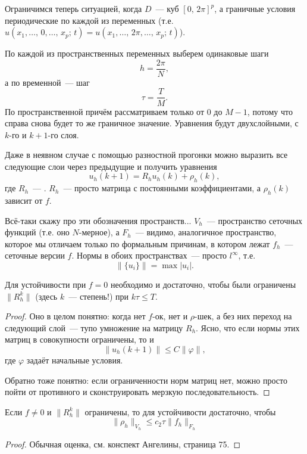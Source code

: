 \documentclass{trlnotes}
\begin{document}
	Ограничимся теперь ситуацией, когда $D$~--- куб $[0, \, 2\pi]^p$, а граничные условия периодические по каждой из переменных (т.е. $u(x_1, \ldots, \, 0, \ldots, \, x_p; \, t) = u(x_1, \ldots, \, 2\pi, \ldots, \, x_p; \, t)$). 

	По каждой из пространственных переменных выберем одинаковые шаги
	\[
		h = \dfrac{2\pi}{N},
	\] 
	а по временной~--- шаг
	\[
		\tau = \dfrac{T}{M}.
	\]
	По пространственной причём рассматриваем только от $0$ до $M-1$, потому что справа снова будет то же граничное значение. Уравнения будут двухслойными, с $k$-го и $k+1$-го слоя.

	Даже в неявном случае с помощью разностной прогонки можно выразить все следующие слои через предыдущие и получить уравнения
	\[
		u_h(k + 1) = R_h u_h(k) + \rho_h(k),
	\]
	где $R_h$~--- . $R_h$~--- просто матрица с постоянными коэффициентами, а $\rho_h(k)$ зависит от $f$.

	\begin{rem}
		Всё-таки скажу про эти обозначения пространств... $V_h$~--- пространство сеточных функций  (т.е. оно $N$-мерное), а $F_h$~--- видимо, аналогичное пространство, которое мы отличаем только по формальным причинам, в котором лежат $f_h$~--- сеточные версии $f$. Нормы в обоих пространствах~--- просто $l^{\infty}$, т.е.
		\[
			\big\|\{u_i\}\big\| = \max |u_i|.
		\]
	\end{rem}

	\begin{thm} \label{thm:stab-1}
		Для устойчивости при $f = 0$ необходимо и достаточно, чтобы были ограничены $\|R_h^k\|$ (здесь $k$~--- степень!) при $k\tau \leqslant T$.
		\begin{proof}
			Оно в целом понятно: когда нет $f$-ок, нет и $\rho$-шек, а без них переход на следующий слой~--- тупо умножение на матрицу $R_h$. Ясно, что если нормы этих матриц в совокупности ограничены, то и
			\[
				\|u_h(k+1)\| \leqslant C \|\varphi\|,
			\]
			где $\varphi$ задаёт начальные условия.

			Обратно тоже понятно: если ограниченности норм матриц нет, можно просто пойти от противного и сконструировать мерзкую последовательность.
		\end{proof}
	\end{thm}

	\begin{thm}
		Если $f \neq 0$ и $\|R_h^k\|$ ограничены, то для устойчивости достаточно, чтобы
		\[
			\|\rho_h\|_{V_h} \leqslant c_2 \tau \|f_h\|_{F_h}
		\]
		\begin{proof}
			Обычная оценка, см. конспект Ангелины, страница 75.
		\end{proof}
	\end{thm}
\end{document}
